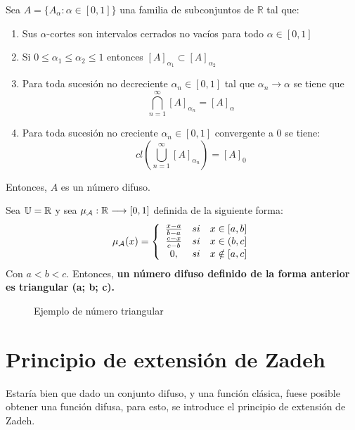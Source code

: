 \begin{teorema}
	Sea $A=\{A_\alpha : \alpha \in [0, 1]\}$ una familia de subconjuntos de $\mathbb{R}$ tal que:
	
	\begin{enumerate}
		\item Sus $\alpha$-cortes son intervalos cerrados no vacíos para todo $\alpha \in [0, 1]$
		\item Si $0 \leq \alpha_1 \leq \alpha_2 \leq 1$ entonces $[A]_{\alpha_1} \subset [A]_{\alpha_2}$
		\item Para toda sucesión no decreciente $\alpha_n \in [0, 1]$ tal que $\alpha_n \longrightarrow \alpha$ se tiene que
		$$
		\bigcap^\infty_{n=1} [A]_{\alpha_n}=[A]_\alpha
		$$
		\item Para toda sucesión no creciente $\alpha_n \in [0, 1]$ convergente a $0$ se tiene:
		$$
		cl\left(\bigcup^\infty_{n=1} [A]_{\alpha_n}\right)=[A]_0
		$$
	\end{enumerate}
	Entonces, $A$ es un número difuso.
\end{teorema}


\begin{ejemplo}
	Sea $\mathbb U=\mathbb R$ y sea $\mu_\mathcal{A}: \mathbb R \longrightarrow [0, 1]$ definida de la siguiente forma:
	$$
	\mu_\mathcal{A}(x)=\left\{
	\begin{array}{c c c}
	\frac{x-a}{b-a} & si & x \in [a, b] \\
	\frac{c-x}{c-b} & si & x \in (b, c] \\
	0, & si & x \notin [a, c]
	\end{array}
	\right.
	$$
	Con $a < b < c$. Entonces, \textbf{un número difuso definido de la forma anterior es triangular (a; b; c).} 
	
	\begin{figure}[h]
		\centering
		\caption{Ejemplo de número triangular}
		\label{fig:numero_difuso}
	\end{figure}
	
\end{ejemplo}


\section{Principio de extensión de Zadeh}
Estaría bien que dado un conjunto difuso, y una función clásica, fuese posible obtener una función difusa, para esto, se introduce el principio de extensión de Zadeh.

